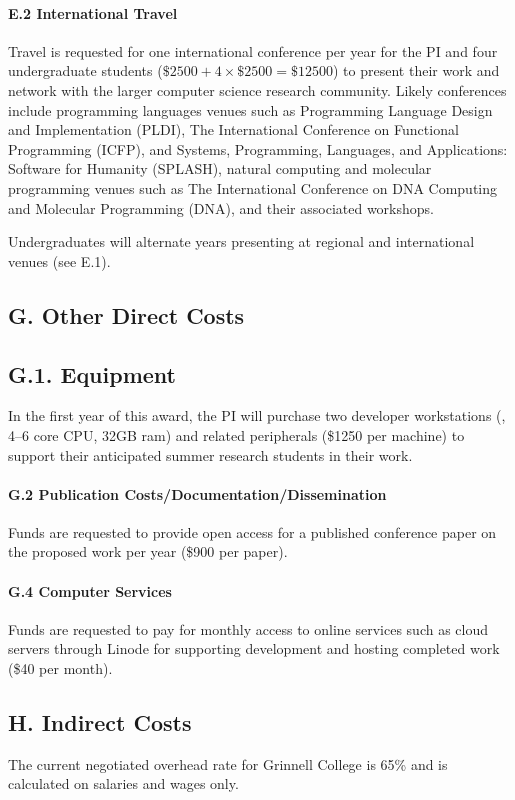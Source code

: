 \documentclass[11pt]{article}
\begin{document}
\paragraph{E.2 International Travel}
Travel is requested for one international conference per year for the PI and four undergraduate students (\( \$2500 + 4 × \$2500 = \$12500 \)) to present their work and network with the larger computer science research community.
Likely conferences include programming languages venues such as Programming Language Design and Implementation (PLDI), The International Conference on Functional Programming (ICFP), and Systems, Programming, Languages, and Applications: Software for Humanity (SPLASH), natural computing and molecular programming venues such as The International Conference on DNA Computing and Molecular Programming (DNA), and their associated workshops.

Undergraduates will alternate years presenting at regional and international venues (see E.1).

\subsection*{G. Other Direct Costs}

\subsection*{G.1. Equipment}
In the first year of this award, the PI will purchase two developer workstations (\eg, 4--6 core CPU, 32GB ram) and related peripherals (\$1250 per machine) to support their anticipated summer research students in their work.

\paragraph{G.2 Publication Costs/Documentation/Dissemination}
Funds are requested to provide open access for a published conference paper on the proposed work per year (\$900 per paper).

\paragraph{G.4 Computer Services}
Funds are requested to pay for monthly access to online services such as cloud servers through Linode for supporting development and hosting completed work (\$40 per month).

\subsection*{H. Indirect Costs}
The current negotiated overhead rate for Grinnell College is 65\% and is calculated on salaries and wages only.
\end{document}

